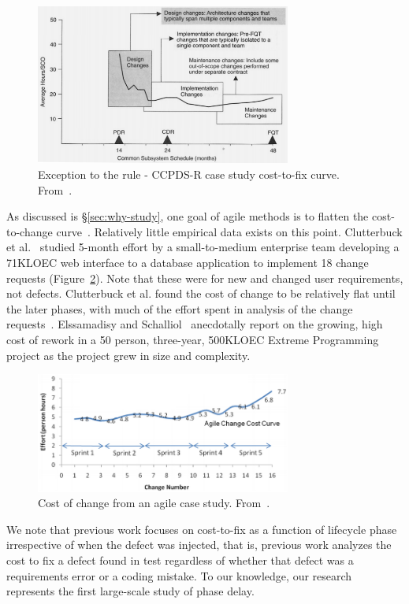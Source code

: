 \begin{figure}[!ht]
 \includegraphics[width=3.3in]{Royce98.png}
 \caption{Exception to the rule - CCPDS-R case study cost-to-fix curve. From~\cite{Royce98}.}\label{fig:royce}
 \end{figure}
 
As discussed is \S\ref{sec:why-study}, one goal of agile methods is to flatten the cost-to-change curve~\cite{beck00}. Relatively little empirical data exists on this point. Clutterbuck et al.~\cite{Clutterbuck09} studied 5-month effort by a small-to-medium enterprise team developing a 71KLOEC web interface to a database application to implement 18 change requests (Figure~\ref{fig:clutterbuck}). Note that these were for new and changed user requirements, not defects. Clutterbuck et al. found the cost of change to be relatively flat until the later phases, with much of the effort spent in analysis of the change requests~\cite{Clutterbuck09}. Elssamadisy and Schalliol~\cite{Elssamadisy02} anecdotally report on the growing, high cost of rework in a 50 person, three-year, 500KLOEC Extreme Programming project as the project grew in size and complexity.

\begin{figure}[!ht]
 \includegraphics[width=3.3in]{clutterbuck.png}
 \caption{Cost of change from an agile case study. From~\cite{Clutterbuck09}.}\label{fig:clutterbuck}
 \end{figure}
 
 We note that previous work focuses on cost-to-fix as a function of lifecycle phase irrespective of when the defect was injected, that is, previous work analyzes the cost to fix a defect found in test regardless of whether that defect was a requirements error or a coding mistake. To our knowledge, our research represents the first large-scale study of phase delay.